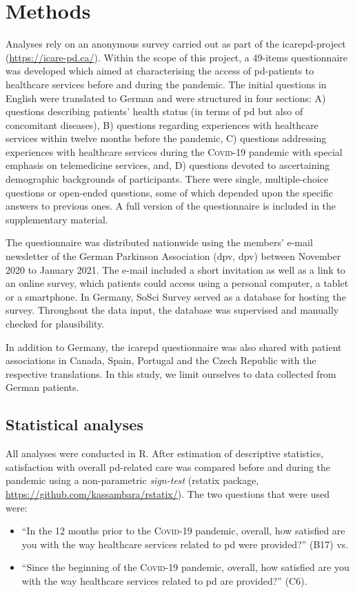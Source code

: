 \documentclass{bmcart}
\begin{document}
\section*{Methods}
Analyses rely on an anonymous survey carried out as part of the \ac{icarepd}-project (\url{https://icare-pd.ca/}). Within the scope of this project, a 49-items questionnaire was developed which aimed at characterising the access of \ac{pd}-patients to healthcare services before and during the pandemic. The initial questions in English were translated to German and were structured in four sections: A) questions describing patients' health status (in terms of \ac{pd} but also of concomitant diseases), B) questions regarding experiences with healthcare services within twelve months before the pandemic, C) questions addressing experiences with healthcare services during the \textsc{Covid}-19 pandemic with special emphasis on telemedicine services, and, D) questions devoted to ascertaining demographic backgrounds of participants. There were single, multiple-choice questions or open-ended questions, some of which depended upon the specific answers to previous ones. A full version of the questionnaire is included in the supplementary material. 

The questionnaire was distributed nationwide using the members’ e-mail newsletter of the German Parkinson Association (\acl{dpv}, \acs{dpv}) between November 2020 to January 2021. The e-mail included a short invitation as well as a link to an online survey, which patients could access using a personal computer, a tablet or a smartphone. In Germany, SoSci Survey \cite{leiner2016} served as a database for hosting the survey. Throughout the data input, the database was supervised and manually checked for plausibility. 

In addition to Germany, the \ac{icarepd} questionnaire was also shared with patient associations in Canada, Spain, Portugal and the Czech Republic with the respective translations. In this study, we limit ourselves to data collected from German patients. 

\subsection*{Statistical analyses}
All analyses were conducted in R\cite{rcore}. After estimation of descriptive statistics, satisfaction with overall \ac{pd}-related care was compared before and during the pandemic using a non-parametric \textit{sign-test} (rstatix package, \url{https://github.com/kassambara/rstatix/}). The two questions that were used were: 
\begin{itemize}
\item ``In the 12 months prior to the  \textsc{Covid}-19 pandemic, overall, how satisfied are you with the way healthcare services related to \acl{pd} were provided?'' (B17) vs.
\item ``Since the beginning of the \textsc{Covid}-19 pandemic, overall, how satisfied are you with the way healthcare services related to \acl{pd} are provided?'' (C6).
\end{itemize}
\end{document}
